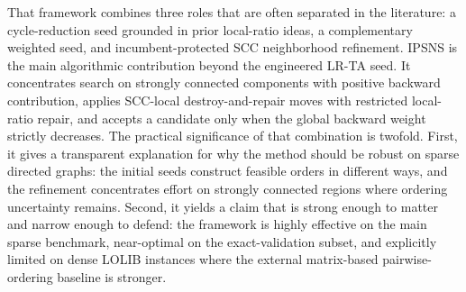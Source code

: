 That framework combines three roles that are often separated in the literature: a cycle-reduction seed grounded in prior local-ratio ideas, a complementary weighted seed, and incumbent-protected SCC neighborhood refinement. IPSNS is the main algorithmic contribution beyond the engineered LR-TA seed. It concentrates search on strongly connected components with positive backward contribution, applies SCC-local destroy-and-repair moves with restricted local-ratio repair, and accepts a candidate only when the global backward weight strictly decreases. The practical significance of that combination is twofold. First, it gives a transparent explanation for why the method should be robust on sparse directed graphs: the initial seeds construct feasible orders in different ways, and the refinement concentrates effort on strongly connected regions where ordering uncertainty remains. Second, it yields a claim that is strong enough to matter and narrow enough to defend: the framework is highly effective on the main sparse benchmark, near-optimal on the exact-validation subset, and explicitly limited on dense LOLIB instances where the external matrix-based pairwise-ordering baseline is stronger.
